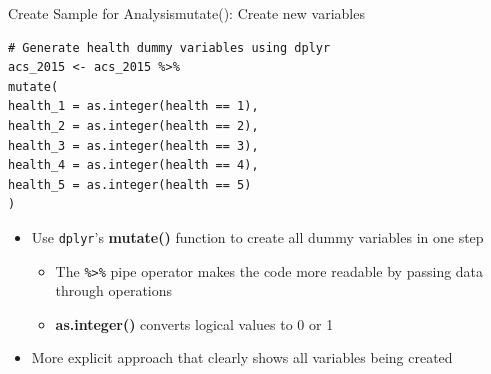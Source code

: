 \documentclass[dvipsnames,hyperref={pdfpagelabels=false}]{beamer}
\begin{document}
\begin{frame}[fragile]{Create Sample for Analysis}{mutate(): Create new variables}
\begin{lstlisting}
# Generate health dummy variables using dplyr
acs_2015 <- acs_2015 %>%
mutate(
health_1 = as.integer(health == 1),
health_2 = as.integer(health == 2),
health_3 = as.integer(health == 3),
health_4 = as.integer(health == 4),
health_5 = as.integer(health == 5)
)
\end{lstlisting}
		\vspace{0.2cm}
	\begin{itemize}
		\item Use \texttt{dplyr}'s \textbf{mutate()} function to create all dummy variables in one step
		\vspace{0.2cm}
			\begin{itemize}
		\item The \texttt{\%>\%} pipe operator makes the code more readable by passing data through operations
		\vspace{0.2cm}
		\item \textbf{as.integer()} converts logical values to 0 or 1
		\vspace{0.2cm}
			\end{itemize}
		\item More explicit approach that clearly shows all variables being created
	\end{itemize}
\end{frame}



\end{document}
